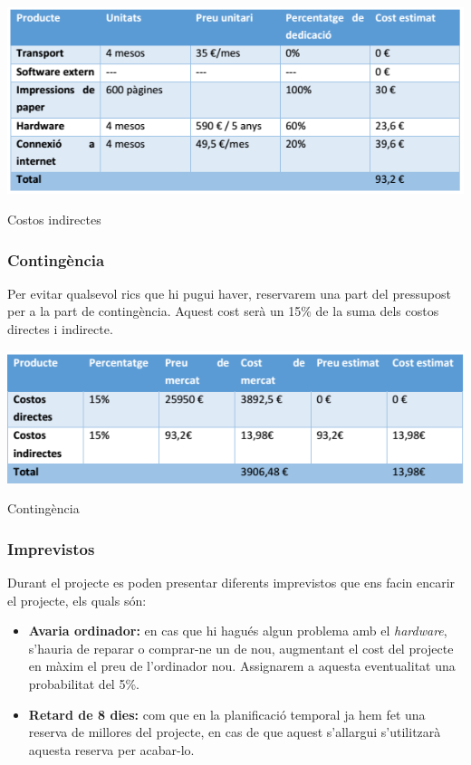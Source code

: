 \documentclass[11pt,catalan,listoffigures,listoftables]{tfgetsinf}
\begin{document}
\begin{table}[h]
\centering
\includegraphics[width=15cm]{images/taula3}
\caption[Taula 7.2]{Costos indirectes}
\centering
\end{table}

\subsubsection{Contingència}

Per evitar qualsevol rics que hi pugui haver, reservarem una part del pressupost per a la part de contingència. Aquest cost serà un 15\% de la suma dels costos directes i indirecte.

\begin{table}[h]
\centering
\includegraphics[width=15cm]{images/taula4}
\caption[Taula 7.3]{Contingència}
\centering
\end{table}

\subsubsection{Imprevistos}

Durant el projecte es poden presentar diferents imprevistos que ens facin encarir el projecte, els quals són:
\begin{itemize}
	\item \textbf{Avaria ordinador:} en cas que hi hagués algun problema amb el \textit{hardware}, s’hauria de reparar o comprar-ne un de nou, augmentant el cost del projecte en màxim el preu de l’ordinador nou. Assignarem a aquesta eventualitat una probabilitat del 5\%.
	\item \textbf{Retard de 8 dies:} com que en la planificació temporal ja hem fet una reserva de millores del projecte, en cas de que aquest s’allargui s’utilitzarà aquesta reserva per acabar-lo.
\end{itemize}
\end{document}
